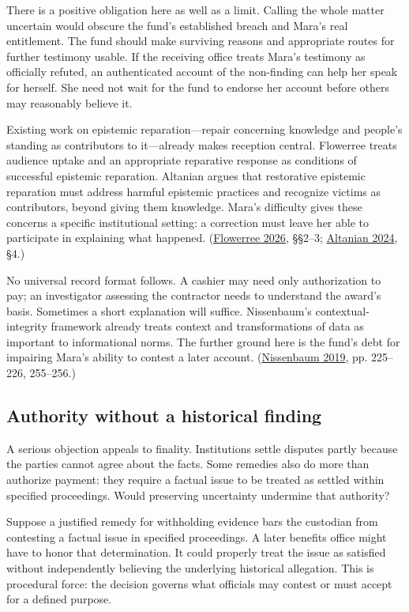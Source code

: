 There is a positive obligation here as well as a limit. Calling the whole matter uncertain would obscure the fund’s established breach and Mara’s real entitlement. The fund should make surviving reasons and appropriate routes for further testimony usable. If the receiving office treats Mara’s testimony as officially refuted, an authenticated account of the non-finding can help her speak for herself. She need not wait for the fund to endorse her account before others may reasonably believe it.

Existing work on epistemic reparation—repair concerning knowledge and people’s standing as contributors to it—already makes reception central. Flowerree treats audience uptake and an appropriate reparative response as conditions of successful epistemic reparation. Altanian argues that restorative epistemic reparation must address harmful epistemic practices and recognize victims as contributors, beyond giving them knowledge. Mara’s difficulty gives these concerns a specific institutional setting: a correction must leave her able to participate in explaining what happened. (\hyperlink{ref:flowerree2026}{Flowerree 2026}, §§2–3; \hyperlink{ref:altanian2024}{Altanian 2024}, §4.)

No universal record format follows. A cashier may need only authorization to pay; an investigator assessing the contractor needs to understand the award’s basis. Sometimes a short explanation will suffice. Nissenbaum’s contextual-integrity framework already treats context and transformations of data as important to informational norms. The further ground here is the fund’s debt for impairing Mara’s ability to contest a later account. (\hyperlink{ref:nissenbaum2019}{Nissenbaum 2019}, pp. 225–226, 255–256.)

\subsection*{Authority without a historical finding}

A serious objection appeals to finality. Institutions settle disputes partly because the parties cannot agree about the facts. Some remedies also do more than authorize payment: they require a factual issue to be treated as settled within specified proceedings. Would preserving uncertainty undermine that authority?

Suppose a justified remedy for withholding evidence bars the custodian from contesting a factual issue in specified proceedings. A later benefits office might have to honor that determination. It could properly treat the issue as satisfied without independently believing the underlying historical allegation. This is procedural force: the decision governs what officials may contest or must accept for a defined purpose.

